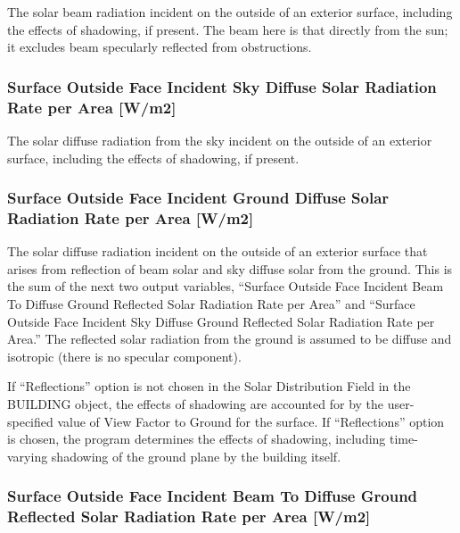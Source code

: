 The solar beam radiation incident on the outside of an exterior surface, including the effects of shadowing, if present. The beam here is that directly from the sun; it excludes beam specularly reflected from obstructions.

\subsubsection{Surface Outside Face Incident Sky Diffuse Solar Radiation Rate per Area {[}W/m2{]}}\label{surface-outside-face-incident-sky-diffuse-solar-radiation-rate-per-area-wm2}

The solar diffuse radiation from the sky incident on the outside of an exterior surface, including the effects of shadowing, if present.

\subsubsection{Surface Outside Face Incident Ground Diffuse Solar Radiation Rate per Area {[}W/m2{]}}\label{surface-outside-face-incident-ground-diffuse-solar-radiation-rate-per-area-wm2}

The solar diffuse radiation incident on the outside of an exterior surface that arises from reflection of beam solar and sky diffuse solar from the ground. This is the sum of the next two output variables, ``Surface Outside Face Incident Beam To Diffuse Ground Reflected Solar Radiation Rate per Area'' and ``Surface Outside Face Incident Sky Diffuse Ground Reflected Solar Radiation Rate per Area.'' The reflected solar radiation from the ground is assumed to be diffuse and isotropic (there is no specular component).

If ``Reflections'' option is not chosen in the Solar Distribution Field in the BUILDING object, the effects of shadowing are accounted for by the user-specified value of View Factor to Ground for the surface. If ``Reflections'' option is chosen, the program determines the effects of shadowing, including time-varying shadowing of the ground plane by the building itself.

\subsubsection{Surface Outside Face Incident Beam To Diffuse Ground Reflected Solar Radiation Rate per Area {[}W/m2{]}}\label{surface-outside-face-incident-beam-to-diffuse-ground-reflected-solar-radiation-rate-per-area-wm2}

